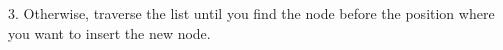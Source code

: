 \documentclass[preview]{standalone}
\begin{document}
3. Otherwise, traverse the list until you find the node before the position where you want to insert the new node.\\
\end{document}
